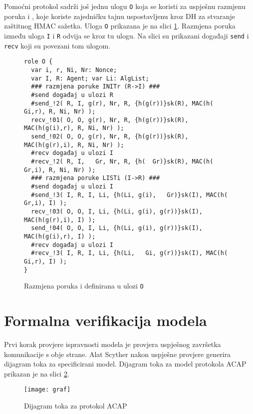 Pomoćni protokol sadrži još jednu ulogu \texttt{O} koja se koristi za uspješnu
razmjenu poruka \initr{} i \listi{}, koje koriste zajedničku tajnu uspostavljenu
kroz DH za stvaranje zaštitnog HMAC sažetka. Uloga \texttt{O}
prikazana je na slici \ref{fig:exec_o}. Razmjena poruka između uloga \texttt{I}
i \texttt{R} odvija se kroz tu ulogu. Na slici su prikazani događaji
\texttt{send} i \texttt{recv} koji su povezani tom ulogom.

\begin{figure}[H]
\begin{small}
\begin{verbatim}
role O {
  var i, r, Ni, Nr: Nonce;
  var I, R: Agent; var Li: AlgList;
  ### razmjena poruke INITr (R->I) ###
  #send događaj u ulozi R
  #send_!2( R, I, g(r), Nr, R, {h(g(r))}sk(R), MAC(h(  Gi,r), R, Ni, Nr) );
  recv_!01( O, O, g(r), Nr, R, {h(g(r))}sk(R), MAC(h(g(i),r), R, Ni, Nr) );
  send_!02( O, O, g(r), Nr, R, {h(g(r))}sk(R), MAC(h(g(r),i), R, Ni, Nr) );
  #recv događaj u ulozi I
  #recv_!2( R, I,   Gr, Nr, R, {h(  Gr)}sk(R), MAC(h(  Gr,i), R, Ni, Nr) );
  ### razmjena poruke LISTi (I->R) ###
  #send događaj u ulozi I
  #send_!3( I, R, I, Li, {h(Li, g(i),   Gr)}sk(I), MAC(h(  Gr,i), I) );
  recv_!03( O, O, I, Li, {h(Li, g(i), g(r))}sk(I), MAC(h(g(r),i), I) );
  send_!04( O, O, I, Li, {h(Li, g(i), g(r))}sk(I), MAC(h(g(i),r), I) );
  #recv događaj u ulozi I
  #recv_!3( I, R, I, Li, {h(Li,   Gi, g(r))}sk(I), MAC(h(  Gi,r), I) );
}
\end{verbatim}
\end{small}
\vspace{-22pt}
\caption{Razmjena poruka \initr{} i \listi{} definirana u ulozi \texttt{O}}
\label{fig:exec_o}
\end{figure}

\section{Formalna verifikacija modela}
\label{sec:verif}
Prvi korak provjere ispravnosti modela je provjera
uspješnog završetka komunikacije s obje strane.
Alat Scyther nakon uspješne provjere generira dijagram toka za
specificirani model. Dijagram toka za model protokola ACAP prikazan je na slici
\ref{fig:characterize}. 

\begin{figure}[H]
\begin{centering}
    \texttt{[image: graf]}
    \caption{Dijagram toka za protokol ACAP}
    \label{fig:characterize}
\end{centering}
\end{figure}

